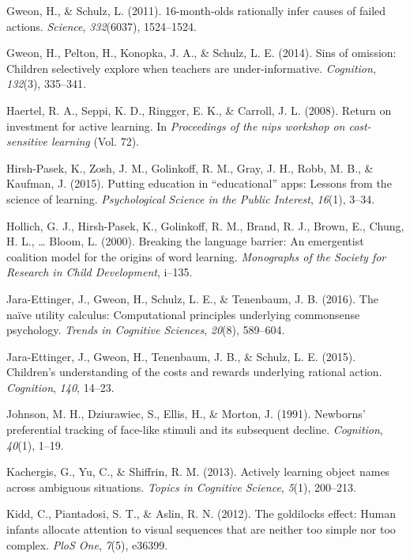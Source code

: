 \documentclass[english,floatsintext,man]{apa6}
\theoremstyle{definition}
\theoremstyle{definition}
\theoremstyle{definition}
\theoremstyle{remark}
\begin{document}
\hypertarget{ref-gweon201116}{}
Gweon, H., \& Schulz, L. (2011). 16-month-olds rationally infer causes
of failed actions. \emph{Science}, \emph{332}(6037), 1524--1524.

\hypertarget{ref-gweon2014sins}{}
Gweon, H., Pelton, H., Konopka, J. A., \& Schulz, L. E. (2014). Sins of
omission: Children selectively explore when teachers are
under-informative. \emph{Cognition}, \emph{132}(3), 335--341.

\hypertarget{ref-haertel2008return}{}
Haertel, R. A., Seppi, K. D., Ringger, E. K., \& Carroll, J. L. (2008).
Return on investment for active learning. In \emph{Proceedings of the
nips workshop on cost-sensitive learning} (Vol. 72).

\hypertarget{ref-hirsh2015putting}{}
Hirsh-Pasek, K., Zosh, J. M., Golinkoff, R. M., Gray, J. H., Robb, M.
B., \& Kaufman, J. (2015). Putting education in ``educational'' apps:
Lessons from the science of learning. \emph{Psychological Science in the
Public Interest}, \emph{16}(1), 3--34.

\hypertarget{ref-hollich2000breaking}{}
Hollich, G. J., Hirsh-Pasek, K., Golinkoff, R. M., Brand, R. J., Brown,
E., Chung, H. L., \ldots{} Bloom, L. (2000). Breaking the language
barrier: An emergentist coalition model for the origins of word
learning. \emph{Monographs of the Society for Research in Child
Development}, i--135.

\hypertarget{ref-jara2016naive}{}
Jara-Ettinger, J., Gweon, H., Schulz, L. E., \& Tenenbaum, J. B. (2016).
The naïve utility calculus: Computational principles underlying
commonsense psychology. \emph{Trends in Cognitive Sciences},
\emph{20}(8), 589--604.

\hypertarget{ref-jara2015children}{}
Jara-Ettinger, J., Gweon, H., Tenenbaum, J. B., \& Schulz, L. E. (2015).
Children's understanding of the costs and rewards underlying rational
action. \emph{Cognition}, \emph{140}, 14--23.

\hypertarget{ref-johnson1991newborns}{}
Johnson, M. H., Dziurawiec, S., Ellis, H., \& Morton, J. (1991).
Newborns' preferential tracking of face-like stimuli and its subsequent
decline. \emph{Cognition}, \emph{40}(1), 1--19.

\hypertarget{ref-kachergis2013actively}{}
Kachergis, G., Yu, C., \& Shiffrin, R. M. (2013). Actively learning
object names across ambiguous situations. \emph{Topics in Cognitive
Science}, \emph{5}(1), 200--213.

\hypertarget{ref-kidd2012goldilocks}{}
Kidd, C., Piantadosi, S. T., \& Aslin, R. N. (2012). The goldilocks
effect: Human infants allocate attention to visual sequences that are
neither too simple nor too complex. \emph{PloS One}, \emph{7}(5),
e36399.
\end{document}

